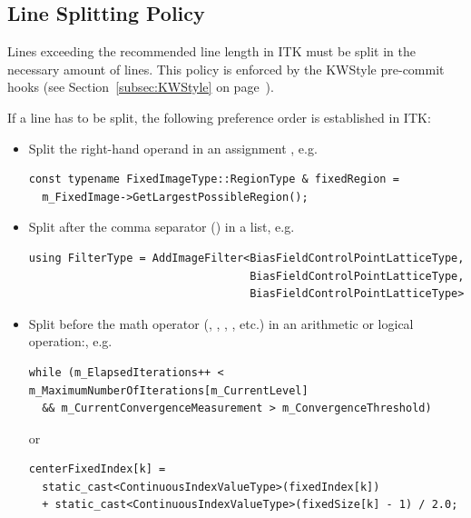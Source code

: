 \subsection{Line Splitting Policy}%
\label{subsec:LineSplittingPolicy}

Lines exceeding the recommended line length in ITK must be split in the
necessary amount of lines. This policy is enforced by the KWStyle pre-commit
hooks (see Section~\ref{subsec:KWStyle} on page~\pageref{subsec:KWStyle}).

If a line has to be split, the following preference order is established in ITK:
\begin{itemize}
\item Split the right-hand operand in an assignment \code{=}, e.g.

\small
\begin{verbatim}
const typename FixedImageType::RegionType & fixedRegion =
  m_FixedImage->GetLargestPossibleRegion();
\end{verbatim}
\normalsize

\item Split after the comma separator (\code{,}) in a list, e.g.

\small
\begin{verbatim}
using FilterType = AddImageFilter<BiasFieldControlPointLatticeType,
                                  BiasFieldControlPointLatticeType,
                                  BiasFieldControlPointLatticeType>
\end{verbatim}
\normalsize

\item Split before the math operator (\code{+}, \code{*}, \code{||}, \code{\&\&},
etc.) in an arithmetic or logical operation:, e.g.

\small
\begin{verbatim}
while (m_ElapsedIterations++ < m_MaximumNumberOfIterations[m_CurrentLevel]
  && m_CurrentConvergenceMeasurement > m_ConvergenceThreshold)
\end{verbatim}
\normalsize

or

\small
\begin{verbatim}
centerFixedIndex[k] =
  static_cast<ContinuousIndexValueType>(fixedIndex[k])
  + static_cast<ContinuousIndexValueType>(fixedSize[k] - 1) / 2.0;
\end{verbatim}
\normalsize

\end{itemize}


